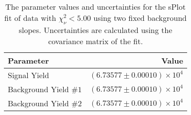 
\begin{table}[ht]
    \begin{center}
        \begin{tabular}{lr}\toprule
            Parameter & Value \\\midrule
            Signal Yield & $(6.73577 \pm 0.00010) \times 10^{4}$ \\
            Background Yield $\#1$ & $(6.73577 \pm 0.00010) \times 10^{4}$ \\
            Background Yield $\#2$ & $(6.73577 \pm 0.00010) \times 10^{4}$ \\\bottomrule
        \end{tabular}
        \caption{The parameter values and uncertainties for the sPlot fit of data with $\chi^2_\nu < 5.00$ using two fixed background slopes. Uncertainties are calculated using the covariance matrix of the fit.}\label{tab:splot-fit-results-chisqdof-5.00-fixed-2}
    \end{center}
\end{table}
